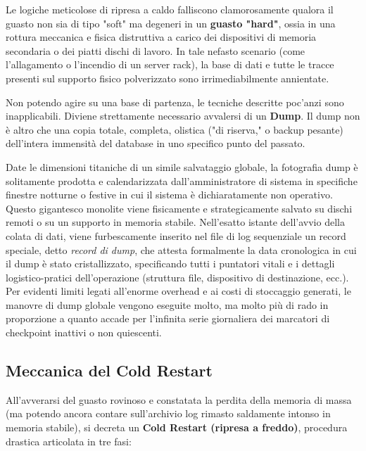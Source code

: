 Le logiche meticolose di ripresa a caldo falliscono clamorosamente qualora il guasto non sia di tipo "soft" ma degeneri in un \textbf{guasto "hard"}, ossia in una rottura meccanica e fisica distruttiva a carico dei dispositivi di memoria secondaria o dei piatti dischi di lavoro. In tale nefasto scenario (come l'allagamento o l'incendio di un server rack), la base di dati e tutte le tracce presenti sul supporto fisico polverizzato sono irrimediabilmente annientate.

Non potendo agire su una base di partenza, le tecniche descritte poc'anzi sono inapplicabili. Diviene strettamente necessario avvalersi di un \textbf{Dump}. Il dump non è altro che una copia totale, completa, olistica ("di riserva," o backup pesante) dell'intera immensità del database in uno specifico punto del passato.

Date le dimensioni titaniche di un simile salvataggio globale, la fotografia dump è solitamente prodotta e calendarizzata dall'amministratore di sistema in specifiche finestre notturne o festive in cui il sistema è dichiaratamente non operativo. Questo gigantesco monolite viene fisicamente e strategicamente salvato su dischi remoti o su un supporto in memoria stabile. Nell'esatto istante dell'avvio della colata di dati, viene furbescamente inserito nel file di log sequenziale un record speciale, detto \textit{record di dump}, che attesta formalmente la data cronologica in cui il dump è stato cristallizzato, specificando tutti i puntatori vitali e i dettagli logistico-pratici dell'operazione (struttura file, dispositivo di destinazione, ecc.). Per evidenti limiti legati all'enorme overhead e ai costi di stoccaggio generati, le manovre di dump globale vengono eseguite molto, ma molto più di rado in proporzione a quanto accade per l'infinita serie giornaliera dei marcatori di checkpoint inattivi o non quiescenti.

\subsection{Meccanica del Cold Restart}
All'avverarsi del guasto rovinoso e constatata la perdita della memoria di massa (ma potendo ancora contare sull'archivio log rimasto saldamente intonso in memoria stabile), si decreta un \textbf{Cold Restart (ripresa a freddo)}, procedura drastica articolata in tre fasi:

